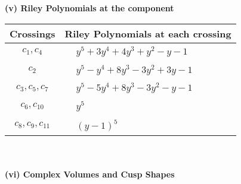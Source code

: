 \documentclass[1p]{elsarticle_modified}
\theoremstyle{definition}
\begin{document}
\newpage\renewcommand{\arraystretch}{1}
\flushleft \textbf{(v) Riley Polynomials at the component}\newline \\
\begin{tabular}{m{50pt}|m{274pt}}
Crossings & \hspace{64pt}Riley Polynomials at each crossing \\
\hline $$\begin{aligned}c_{1},c_{4}\end{aligned}$$&$\begin{aligned}
&y^5+3 y^4+4 y^3+y^2- y-1
\end{aligned}$\\
\hline $$\begin{aligned}c_{2}\end{aligned}$$&$\begin{aligned}
&y^5- y^4+8 y^3-3 y^2+3 y-1
\end{aligned}$\\
\hline $$\begin{aligned}c_{3},c_{5},c_{7}\end{aligned}$$&$\begin{aligned}
&y^5-5 y^4+8 y^3-3 y^2- y-1
\end{aligned}$\\
\hline $$\begin{aligned}c_{6},c_{10}\end{aligned}$$&$\begin{aligned}
&y^5
\end{aligned}$\\
\hline $$\begin{aligned}c_{8},c_{9},c_{11}\end{aligned}$$&$\begin{aligned}
&(y-1)^5
\end{aligned}$\\
\hline
\end{tabular}\\~\\
\newpage\flushleft \textbf{(vi) Complex Volumes and Cusp Shapes}
\end{document}

